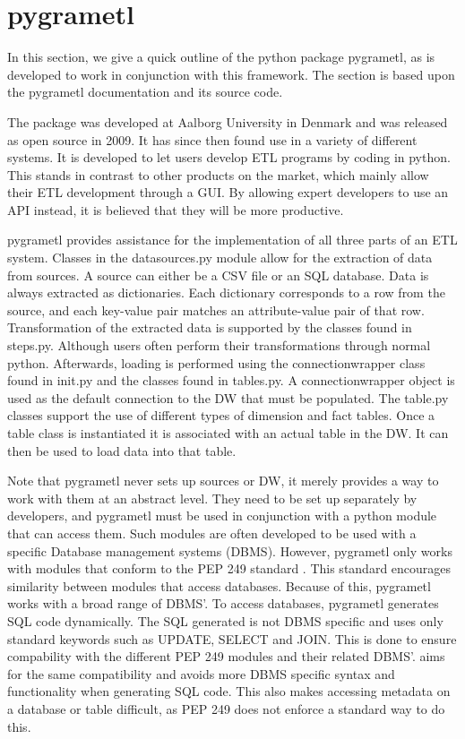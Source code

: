 \section{pygrametl}\label{sect:pygrametl}
In this section, we give a quick outline of the python package pygrametl, as \FW{} is developed to work in conjunction with this framework. The section is based upon the pygrametl documentation and its source code\cite{pygramSource}.

The package was developed at Aalborg University in Denmark and was released as open source in 2009. It has since then found use in a variety of different systems. It is developed to let users develop ETL programs by coding in python. This stands in contrast to other products on the market, which mainly allow their ETL development through a GUI. By allowing expert developers to use an API instead, it is believed that they will be more productive.

pygrametl provides assistance for the implementation of all three parts of an ETL system. Classes in the datasources.py module allow for the extraction of data from sources. A source can either be a CSV file or an SQL database. Data is always extracted as dictionaries. Each dictionary corresponds to a row from the source, and each key-value pair matches an attribute-value pair of that row. Transformation of the extracted data is supported by the classes found in steps.py. Although users often perform their transformations through normal python. Afterwards, loading is performed using the connectionwrapper class found in init.py and the classes found in tables.py. A connectionwrapper object is used as the default connection to the DW that must be populated. The table.py classes support the use of different types of dimension and fact tables. Once a table class is instantiated it is associated with an actual table in the DW. It can then be used to load data into that table.

Note that pygrametl never sets up sources or DW, it merely provides a way to work with them at an abstract level. They need to be set up separately by developers, and pygrametl must be used in conjunction with a python module that can access them. Such modules are often developed to be used with a specific Database management systems (DBMS). However, pygrametl only works with modules that conform to the PEP 249 standard \cite{pep249}. This standard encourages similarity between modules that access databases. Because of this, pygrametl works with a broad range of DBMS’. To access databases, pygrametl generates SQL code dynamically. The SQL generated is not DBMS specific and uses only standard keywords such as UPDATE, SELECT and JOIN. This is done to ensure compability with the different PEP 249 modules and their related DBMS’. \FW{} aims for the same compatibility and avoids more DBMS specific syntax and functionality when generating SQL code. This also makes accessing metadata on a database or table difficult, as PEP 249 does not enforce a standard way to do this.
